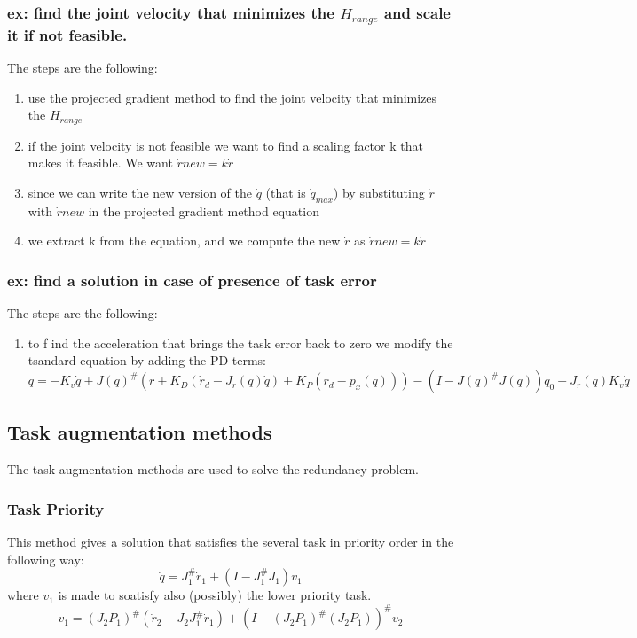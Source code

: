 \documentclass[a4paper,12pt]{article}
\begin{document}
\subsubsection{ex: find the joint velocity that minimizes the $H_{range}$ and scale it if not feasible.}
The steps are the following:
\begin{enumerate}
    \item use the projected gradient method to find the joint
     velocity that minimizes the $H_{range}$
    \item if the joint velocity is not feasible we want to find a 
    scaling factor k that makes it feasible. 
    We want $\dot{r}new = k \dot{r}$
    \item since we can write the new version of the $\dot{q}$ (that is $\dot{q}_{max}$) by substituting 
    $\dot{r}$ with $\dot{r}new$ in the projected gradient method equation
    \item we extract k from the equation, and we compute the new $\dot{r}$ as $\dot{r}new = k \dot{r}$
\end{enumerate}
\subsubsection{ex: find a solution in case of presence of task error}
The steps are the following:
\begin{enumerate}
    \item to f ind the acceleration that brings the 
    task error back to zero we modify the tsandard equation by 
    adding the PD terms:
    $\ddot{q} = -K_v\dot{q} + J(q)^{\#}(\ddot{r} + K_D(\dot{r}_d - J_r(q)\dot{q}) + K_P(r_d - p_x(q))) - (I - J(q)^{\#}J(q))\ddot{q}_0 + J_r(q)K_v\dot{q}$
\end{enumerate}
    \subsection{Task augmentation methods} \label{sec:Task augmentation methods}
The task augmentation methods are used to solve the redundancy problem.
\subsubsection{Task Priority}\label{sec:Task Priority}
This method gives a solution that satisfies the several task in priority order in the following way:
\begin{equation}
    \dot{q} = J_1^\# \dot{r}_1 + (I - J_1^\# J_1)v_1
\end{equation}
where $v_1$ is made to soatisfy also (possibly) the lower priority task.
\begin{equation}
    v_1 = (J_2 P_1)^{\#}(\dot{r}_2 - J_2 J_1^\# \dot{r}_1)+(I -( J_2 P_1)^{\#}(J_2P_1))^{\#}v_2
\end{equation}
\end{document}
